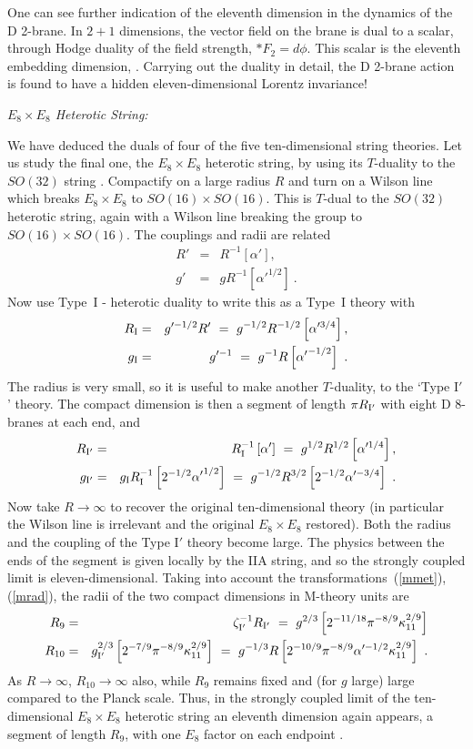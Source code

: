 \documentclass[12pt]{article}
\def\bea{\begin{eqnarray}}
\def\eea{\end{eqnarray}}
\def\ap{\alpha'}
\def\apm{\alpha'}
\begin{document}
One can see further indication of the eleventh dimension in the dynamics
of the D 2-brane.  In $2+1$ dimensions, the vector field on the brane is
dual to a scalar, through Hodge duality of the field strength, $*F_2 =
d\phi$.  This scalar is the eleventh embedding 
dimension\cite{duff11}, \cite{towndf}.
Carrying out the duality in detail, the D 2-brane action is found to have
a hidden eleven-dimensional Lorentz invariance!

{\it $E_8 \times E_8$ Heterotic String:}

We have deduced the duals of four of the five ten-dimensional string
theories.  Let us study the final one, the $E_8 \times E_8$ heterotic
string, by using its $T$-duality to the $SO(32)$ string \cite{narain}.
Compactify on a large radius $R$ and turn on a Wilson line which breaks
$E_8\times E_8$ to $SO(16) \times SO(16)$.  This is $T$-dual to the $SO(32)$
heterotic string, again with a Wilson line breaking the group to 
$SO(16) \times SO(16)$.  The couplings and radii are related
\bea
R' &=& R^{-1} \left[ \apm \right] , \nonumber\\
g' &=& g R^{-1} \left[ {\ap}^{1/2} \right] \ .
\eea
Now use Type~I - heterotic duality to write this as a Type~I theory
with\, \cite{wit}
\bea
R_{\rm I} &=& g'^{-1/2} R'\ =\ g^{-1/2} R^{-1/2} \left[ \apm^{3/4} \right],
\nonumber\\ 
g_{\rm I} &=& g'^{-1}\ =\ g^{-1} R \left[ {\ap}^{-1/2} \right]\ .
\eea
The radius is very small, so it is useful to make another $T$-duality, to
the `Type I$'$' theory.  The compact dimension is then a segment
of length $\pi R_{\rm I'}$ with
eight D 8-branes at each end, and
\bea
R_{\rm I'} &=& R_{\rm I}^{-1} \left[ \apm \right] \ =\ g^{1/2}
R^{1/2} \left[  \apm^{1/4} \right], 
\nonumber\\
g_{\rm I'} &=& g_{\rm I} R_{\rm I}^{-1} \left[ 2^{-1/2} {\ap}^{1/2} \right]\ =\
g^{-1/2} R^{3/2} \left[ 2^{-1/2} \apm^{-3/4} \right]\ .
\eea
Now take $R \to \infty$ to recover the original ten-dimensional theory
(in particular the Wilson line is irrelevant and the original $E_8\times
E_8$ restored).  Both the radius and the coupling of the Type I$'$ theory
become large.  The physics between the ends of the segment is given locally
by the IIA string, and so the strongly coupled limit is
eleven-dimensional.  Taking into account the transformations~(\ref{mmet}),
(\ref{mrad}), the radii of the two compact dimensions in M-theory units are
\bea
R_9 &=& \zeta_{\rm I'}^{-1} R_{\rm I'}\ =\ 
g^{2/3} \left[2^{-11/18} \pi^{-8/9} \kappa_{11}^{2/9} \right]\label{r910}
\\ 
R_{10} &=&
g_{\rm I'}^{2/3} \left[2^{-7/9} \pi^{-8/9} \kappa_{11}^{2/9} \right]
\ =\ 
g^{-1/3} R \left[2^{-10/9} \pi^{-8/9} \ap^{-1/2} \kappa_{11}^{2/9} \right]\ .  
\nonumber
\eea
As $R\to \infty$, $R_{10} \to\infty$ also, while $R_9$ remains fixed and
(for $g$ large) large compared to the Planck scale.  Thus, in the strongly
coupled limit of the ten-dimensional $E_8\times E_8$ heterotic string an
eleventh dimension again appears, a segment of length $R_9$,
with one $E_8$ factor on each endpoint \cite{horwit}.
\end{document}
